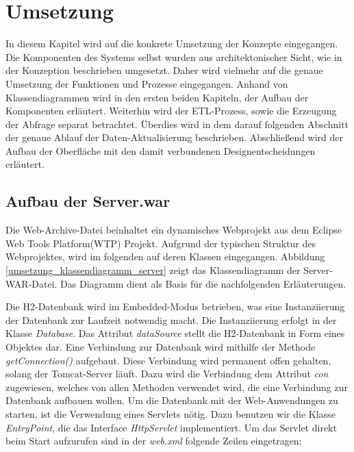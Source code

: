 

\chapter{Umsetzung}
\label{ch:umsetzung}

In diesem Kapitel wird auf die konkrete Umsetzung der Konzepte eingegangen. Die Komponenten des Systems selbst wurden aus architektonischer Sicht, wie in der Konzeption beschrieben umgesetzt. Daher wird vielmehr auf die genaue Umsetzung der Funktionen und Prozesse eingegangen. Anhand von Klassendiagrammen wird in den ersten beiden Kapiteln, der Aufbau der Komponenten erläutert. Weiterhin wird der ETL-Prozess, sowie die Erzeugung der Abfrage separat betrachtet. Überdies wird in dem darauf folgenden Abschnitt der genaue Ablauf der Daten-Aktualisierung beschrieben. Abschließend wird der Aufbau der Oberfläche mit den damit verbundenen Designentscheidungen erläutert. 

\section{Aufbau der Server.war}

Die Web-Archive-Datei beinhaltet ein dynamisches Webprojekt aus dem Eclipse Web Tools Platform(WTP) Projekt. Aufgrund der typischen Struktur des Webprojektes, wird im folgenden auf deren Klassen eingegangen. Abbildung \ref{umsetzung_klassendiagramm_server} zeigt das Klassendiagramm der Server-WAR-Datei. Das Diagramm dient als Basis für die nachfolgenden Erläuterungen. 

Die H2-Datenbank wird im Embedded-Modus betrieben, was eine Instanziierung der Datenbank zur Laufzeit notwendig macht. Die Instanziierung erfolgt in der Klasse \textit{Database}. Das Attribut \textit{dataSource} stellt die H2-Datenbank in Form eines Objektes dar. Eine Verbindung zur Datenbank wird mithilfe der Methode \textit{getConnection()} aufgebaut. Diese Verbindung wird permanent offen gehalten, solang der Tomcat-Server läuft. Dazu wird die Verbindung dem Attribut \textit{con} zugewiesen, welches von allen Methoden verwendet wird, die eine Verbindung zur Datenbank aufbauen wollen. Um die Datenbank mit der Web-Anwendungen zu starten, ist die Verwendung eines Servlets nötig. Dazu benutzen wir die Klasse \textit{EntryPoint}, die das Interface \textit{HttpServlet} implementiert. Um das Servlet direkt beim Start aufzurufen sind in der \textit{web.xml} folgende Zeilen eingetragen: 

